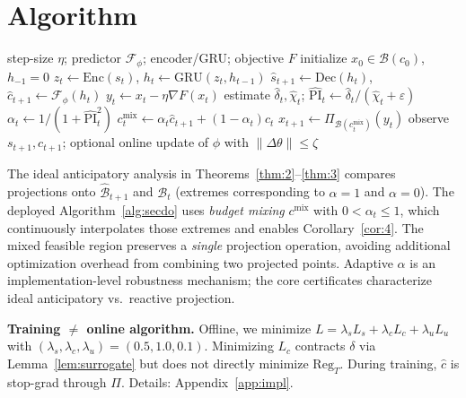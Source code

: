 \section{Algorithm}
\label{sec:algo}

\begin{algorithm}[t]
\caption{SECDO with Predictively Adaptive Projection (implementation uses a continuous relaxation of the theoretical binary regimes $\alpha\in\{0,1\}$).}
\label{alg:secdo}
\begin{algorithmic}[1]
\Require step-size $\eta$; predictor $\mathcal{F}_\phi$; encoder/GRU; objective $F$
\State initialize $x_0\in\mathcal{B}(c_0)$, $h_{-1}=0$
  \State $z_t\leftarrow\mathrm{Enc}(s_t)$,\; $h_t\leftarrow\mathrm{GRU}(z_t,h_{t-1})$
  \State $\hat s_{t+1}\leftarrow\mathrm{Dec}(h_t)$,\; $\hat c_{t+1}\leftarrow\mathcal{F}_\phi(h_t)$
  \State $y_t\leftarrow x_t-\eta\nabla F(x_t)$
  \State estimate $\hat\delta_t,\hat\chi_t$;\; $\widehat{\mathrm{PI}}_t\leftarrow\hat\delta_t/(\hat\chi_t+\varepsilon)$
  \State $\alpha_t\leftarrow 1/(1+\widehat{\mathrm{PI}}_t^2)$
  \State $c^{\mathrm{mix}}_t\leftarrow\alpha_t\hat c_{t+1}+(1-\alpha_t)c_t$
  \State $x_{t+1}\leftarrow\Pi_{\mathcal{B}(c^{\mathrm{mix}}_t)}(y_t)$
  \State observe $s_{t+1},c_{t+1}$; optional online update of $\phi$ with $\|\Delta\theta\|\le\zeta$
\EndFor
\end{algorithmic}
\end{algorithm}

\begin{remark}
\label{rem:alpha}
The ideal anticipatory analysis in Theorems~\ref{thm:2}--\ref{thm:3} compares projections onto $\hat{\mathcal{B}}_{t+1}$ and $\mathcal{B}_t$ (extremes corresponding to $\alpha=1$ and $\alpha=0$).
The deployed Algorithm~\ref{alg:secdo} uses \emph{budget mixing} $c^{\mathrm{mix}}$ with $0<\alpha_t\le 1$, which continuously interpolates those extremes and enables Corollary~\ref{cor:4}.
The mixed feasible region preserves a \emph{single} projection operation, avoiding additional optimization overhead from combining two projected points.
Adaptive $\alpha$ is an implementation-level robustness mechanism; the core certificates characterize ideal anticipatory vs.\ reactive projection.
\end{remark}

\textbf{Training $\neq$ online algorithm.}
Offline, we minimize $L=\lambda_s L_s+\lambda_c L_c+\lambda_u L_u$ with $(\lambda_s,\lambda_c,\lambda_u)=(0.5,1.0,0.1)$.
Minimizing $L_c$ contracts $\delta$ via Lemma~\ref{lem:surrogate} but does not directly minimize $\mathrm{Reg}_T$.
During training, $\hat c$ is stop-grad through $\Pi$.
Details: Appendix~\ref{app:impl}.
